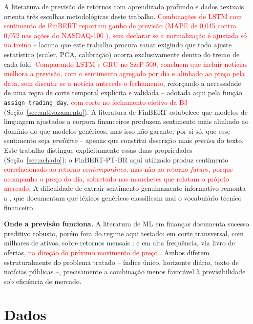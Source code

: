 \documentclass[conference]{IEEEtran}
\newcommand{\novo}[1]{\textcolor{red}{#1}}
\begin{document}
A literatura de previs\~ao de retornos com aprendizado profundo e dados textuais orienta tr\^es escolhas metodol\'ogicas deste trabalho. \novo{Combina\c{c}\~oes de LSTM com sentimento de FinBERT reportam ganho de previs\~ao (MAPE de 0,045 contra 0,072 nas a\c{c}\~oes do NASDAQ-100 \cite{gu2024finbertlstm}), sem declarar se a normaliza\c{c}\~ao \'e ajustada s\'o no treino} -- lacuna que este trabalho procura sanar exigindo que todo ajuste estat\'istico (scaler, PCA, calibra\c{c}\~ao) ocorra exclusivamente dentro do treino de cada fold. \novo{Comparando LSTM e GRU no S\&P 500, \cite{dahal2023comparative} concluem que incluir not\'icias melhora a previs\~ao, com o sentimento agregado por dia e alinhado ao pre\c{c}o pela data, sem discutir se a not\'icia antecede o fechamento,} refor\c{c}ando a necessidade de uma regra de corte temporal expl\'icita e validada -- adotada aqui pela fun\c{c}\~ao \texttt{assign\_trading\_day}, \novo{com corte no fechamento efetivo da B3} (Se\c{c}\~ao~\ref{sec:antivazamento}). A literatura de FinBERT \cite{araci2019finbert} estabelece que modelos de linguagem ajustados a corpora financeiros produzem sentimento mais alinhado ao dom\'inio do que modelos gen\'ericos, mas isso n\~ao garante, por si s\'o, que esse sentimento seja \emph{preditivo} -- apenas que constitui descri\c{c}\~ao mais \emph{precisa} do texto. Este trabalho distingue explicitamente essas duas propriedades (Se\c{c}\~ao~\ref{sec:achado}): o FinBERT-PT-BR aqui utilizado produz sentimento \novo{correlacionado ao retorno \emph{contempor\^aneo}, mas n\~ao ao retorno \emph{futuro}, porque acompanha o pre\c{c}o do dia, sobretudo nas manchetes que relatam o pr\'oprio mercado.} A dificuldade de extrair sentimento genuinamente informativo remonta a \cite{loughran2011}, que documentam que l\'exicos gen\'ericos classificam mal o vocabul\'ario t\'ecnico financeiro.

\textbf{Onde a previs\~ao funciona.} A literatura de ML em finan\c{c}as documenta sucesso preditivo robusto, por\'em fora do regime aqui testado: em corte transversal, com milhares de ativos, sobre retornos mensais \cite{gukellyxiu2020}; e em alta frequ\^encia, via livro de ofertas, \novo{na dire\c{c}\~ao do pr\'oximo movimento de pre\c{c}o} \cite{sirignanocont2019}. Ambos diferem estruturalmente do problema tratado -- \'indice \'unico, horizonte di\'ario, texto de not\'icias p\'ublicas --, precisamente a combina\c{c}\~ao menos favor\'avel \`a previsibilidade sob efici\^encia de mercado.

\section{Dados}
\end{document}
